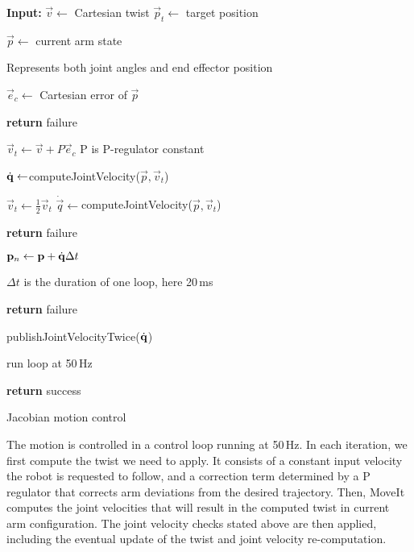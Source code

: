 \documentclass[buriama8_dp.tex]{subfiles}
\begin{document}
\begin{algorithm}[htp]
\begin{algorithmic}
  \State \textbf{Input:}
  \State \(\vec v \gets\) Cartesian twist
  \State \(\vec p_t \gets\) target position
  \vspace{1em}

    \State \(\vec p \gets \) current arm state
    \Comment \parbox[t]{.4\textwidth}{Represents both joint angles and end effector position}
    \State \(\vec e_c \gets \) Cartesian error of \(\vec p\)
    
      \State \textbf{return} failure
    \EndIf

    \State \(\vec v_t \gets \vec v + P \vec e_c\)
    \Comment \m P is P-regulator constant

    \State \(\dot{\mathbf{q}} \gets \)computeJointVelocity(\(\vec p, \vec v_t\))
    \vspace{1em}

      \State \(\vec v_t \gets \frac{1}{2} \vec v_t\)
      \State \(\dot{\vec q} \gets \)computeJointVelocity(\(\vec p, \vec v_t\))
    \EndWhile

      \State \textbf{return} failure
    \EndIf
    \vspace{1em}

    \State \(\mathbf{p}_n \gets \mathbf{p} + \dot{\mathbf{q}} \Delta t\)
    \Comment \parbox[t]{.4\textwidth}{\(\Delta t\) is the duration of one loop, here 20\,ms}

      \State \textbf{return} failure
    \EndIf
    \vspace{1em}

    \State publishJointVelocityTwice(\(\dot{\mathbf{q}}\))

    \State run loop at 50\,Hz
    
  \EndWhile
  \State \textbf{return} success
\end{algorithmic}
\caption{Jacobian motion control}
\label{alg:jacob}
\end{algorithm}


The motion is controlled in a control loop running at 50\,Hz. In each iteration, we first compute the twist we need to apply. It consists of a constant input velocity the robot is requested to follow, and a correction term determined by a P regulator that corrects arm deviations from the desired trajectory. Then, MoveIt computes the joint velocities that will result in the computed twist in current arm configuration. The joint velocity checks stated above are then applied, including the eventual update of the twist and joint velocity re-computation.
\end{document}
